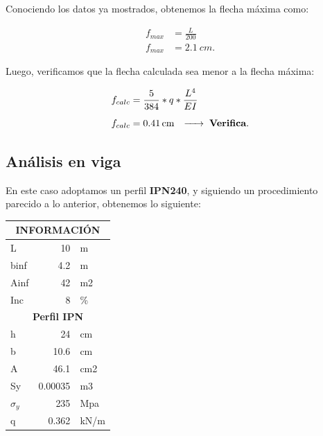 \documentclass[../main.tex]{subfiles}
\begin{document}
Conociendo los datos ya mostrados, obtenemos la flecha máxima como:

\begin{align*}
  f_{max} &= \frac{L}{200} \\[5pt]
  f_{max} &= \SI{2.1}{cm}
.\end{align*}

Luego, verificamos que la flecha calculada sea menor a la flecha máxima:

\begin{align*}
  f_{calc} &= \frac{5}{384} * q * \frac{L^4}{EI} \\[5pt]
  f_{calc} &= \SI{0.41}{cm} \hspace{0.25cm} \xrightarrow{\hspace*{0.5cm}} \hspace{0.1cm} \textbf{Verifica}
.\end{align*}

\clearpage

\subsection{Análisis en viga}

En este caso adoptamos un perfil \textbf{IPN240}, y siguiendo un procedimiento
parecido a lo anterior, obtenemos lo siguiente:

\begin{table}[ht]
  \centering
    \begin{tabular}{|l|r|l|}
    \hline
    \multicolumn{3}{|c|}{\textbf{INFORMACIÓN}} \bigstrut\\
    \hline
    L     & \textcolor[rgb]{ 0,  .439,  .753}{10} & m \bigstrut\\
    \hline
    binf  & \textcolor[rgb]{ 0,  .439,  .753}{4.2} & m \bigstrut\\
    \hline
    Ainf  & \textcolor[rgb]{ 0,  .439,  .753}{42} & m2 \bigstrut\\
    \hline
    Inc   & \textcolor[rgb]{ 0,  .439,  .753}{8} & \% \bigstrut\\
    \hline
    \multicolumn{3}{|c|}{\textbf{Perfil IPN}} \bigstrut\\
    \hline
    h     & \textcolor[rgb]{ 0,  .439,  .753}{24} & cm \bigstrut\\
    \hline
    b     & \textcolor[rgb]{ 0,  .439,  .753}{10.6} & cm \bigstrut\\
    \hline
    A     & \textcolor[rgb]{ 0,  .439,  .753}{46.1} & cm2 \bigstrut\\
    \hline
    Sy    & \textcolor[rgb]{ 0,  .439,  .753}{0.00035} & m3 \bigstrut\\
    \hline
    $\sigma_y$    & \textcolor[rgb]{ 0,  .439,  .753}{235} & Mpa \bigstrut\\
    \hline
    q     & \textcolor[rgb]{ 0,  .439,  .753}{0.362} & kN/m \bigstrut\\
    \hline
    \end{tabular}%
  \label{tab:addlabel}%
\end{table}%
\end{document}
